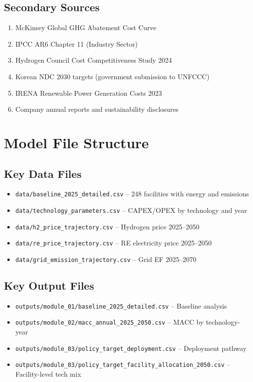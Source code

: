 \documentclass[11pt,a4paper]{report}
\begin{document}
\section{Secondary Sources}

\begin{enumerate}[resume]
    \item McKinsey Global GHG Abatement Cost Curve
    \item IPCC AR6 Chapter 11 (Industry Sector)
    \item Hydrogen Council Cost Competitiveness Study 2024
    \item Korean NDC 2030 targets (government submission to UNFCCC)
    \item IRENA Renewable Power Generation Costs 2023
    \item Company annual reports and sustainability disclosures
\end{enumerate}

\chapter{Model File Structure}

\section{Key Data Files}

\begin{itemize}[leftmargin=*]
    \item \texttt{data/baseline\_2025\_detailed.csv} -- 248 facilities with energy and emissions
    \item \texttt{data/technology\_parameters.csv} -- CAPEX/OPEX by technology and year
    \item \texttt{data/h2\_price\_trajectory.csv} -- Hydrogen price 2025--2050
    \item \texttt{data/re\_price\_trajectory.csv} -- RE electricity price 2025--2050
    \item \texttt{data/grid\_emission\_trajectory.csv} -- Grid EF 2025--2070
\end{itemize}

\section{Key Output Files}

\begin{itemize}[leftmargin=*]
    \item \texttt{outputs/module\_01/baseline\_2025\_detailed.csv} -- Baseline analysis
    \item \texttt{outputs/module\_02/macc\_annual\_2025\_2050.csv} -- MACC by technology-year
    \item \texttt{outputs/module\_03/policy\_target\_deployment.csv} -- Deployment pathway
    \item \texttt{outputs/module\_03/policy\_target\_facility\_allocation\_2050.csv} -- Facility-level tech mix
\end{itemize}
\end{document}
